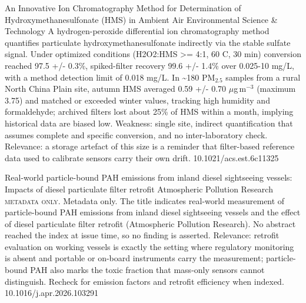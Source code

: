 \documentclass[10pt]{article}
\begin{document}
{An Innovative Ion Chromatography Method for Determination of Hydroxymethanesulfonate (HMS) in Ambient Air}
{Environmental Science \& Technology}
{A hydrogen-peroxide differential ion chromatography method quantifies particulate hydroxymethanesulfonate indirectly via the stable sulfate signal. Under optimized conditions (H2O2:HMS >= 4:1, 60 C, 30 min) conversion reached 97.5 +/- 0.3\%, spiked-filter recovery 99.6 +/- 1.4\% over 0.025-10 mg/L, with a method detection limit of 0.018 mg/L. In \textasciitilde{}180 PM$_{2.5}$ samples from a rural North China Plain site, autumn HMS averaged 0.59 +/- 0.70 $\mu$g\,m$^{-3}$ (maximum 3.75) and matched or exceeded winter values, tracking high humidity and formaldehyde; archived filters lost about 25\% of HMS within a month, implying historical data are biased low. Weakness: single site, indirect quantification that assumes complete and specific conversion, and no inter-laboratory check. Relevance: a storage artefact of this size is a reminder that filter-based reference data used to calibrate sensors carry their own drift.}
{10.1021/acs.est.6c11325}

\par{}\baselineskip{}\baselineskip
{}

{Real-world particle-bound PAH emissions from inland diesel sightseeing vessels: Impacts of diesel particulate filter retrofit}
{Atmospheric Pollution Research}
{\textsc{metadata only.} Metadata only. The title indicates real-world measurement of particle-bound PAH emissions from inland diesel sightseeing vessels and the effect of diesel particulate filter retrofit (Atmospheric Pollution Research). No abstract reached the index at issue time, so no finding is asserted. Relevance: retrofit evaluation on working vessels is exactly the setting where regulatory monitoring is absent and portable or on-board instruments carry the measurement; particle-bound PAH also marks the toxic fraction that mass-only sensors cannot distinguish. Recheck for emission factors and retrofit efficiency when indexed.}
{10.1016/j.apr.2026.103291}
\end{document}
